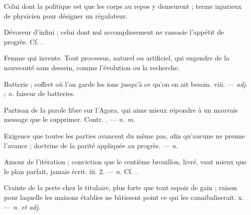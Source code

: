  Celui dont la politique est que les corps au repos y demeurent ; terme injurieux de physicien pour désigner un régulateur.

 Dévoreur d'infini ; celui dont nul accomplissement ne rassasie l'appétit de progrès. Cf. .

  Femme qui invente.   Tout processus, naturel ou artificiel, qui engendre de la nouveauté sans dessein, comme l'évolution ou la recherche.

 Batterie ; coffret où l'on garde les ions jusqu'à ce qu'on en ait besoin.   viii. ---  \textit{adj.} ;  \textit{n.} faiseur de batteries.

 Partisan de la parole libre sur l'Agora, qui aime mieux répondre à un mauvais message que le supprimer. Contr. . ---  \textit{n. m.}

 Exigence que toutes les parties avancent du même pas, afin qu'aucune ne prenne l'avance ; doctrine de la parité appliquée au progrès. ---  \textit{n.}

 Amour de l'itération ; conviction que le centième brouillon, livré, vaut mieux que le plan parfait, jamais écrit.   iii. 2. ---  \textit{n.} Cf. .

 Crainte de la perte chez le titulaire, plus forte que tout espoir de gain ; raison pour laquelle les maisons établies ne bâtissent point ce qui les cannibaliserait.   x. ---  \textit{n. et adj.}

